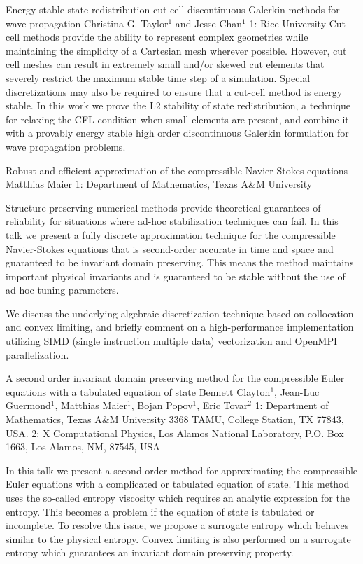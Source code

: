 \begin{addmargin}[2em]{0em}
\vspace{2ex}
\abs
{Energy stable state redistribution cut-cell discontinuous Galerkin methods for wave propagation}
{Christina G. Taylor$^{1}$ and Jesse Chan$^{1}$}
{1: Rice University}
{Cut cell methods provide the ability to represent complex geometries while maintaining the simplicity of a Cartesian mesh wherever possible. However, cut cell meshes can result in extremely small and/or skewed cut elements that severely restrict the maximum stable time step of a simulation. Special discretizations may also be required to ensure that a cut-cell method is energy stable. In this work we prove the L2 stability of state redistribution, a technique for relaxing the CFL condition when small elements are present, and combine it with a provably energy stable high order discontinuous Galerkin formulation for wave propagation problems.}


\vspace{1.5ex}
\abs
{Robust and efficient approximation of the compressible Navier-Stokes equations}
{Matthias Maier}
{1: Department of Mathematics, Texas A\&M University}
{
	Structure preserving numerical methods provide theoretical guarantees of
	reliability for situations where ad-hoc stabilization techniques can fail.
	In this talk we present a fully discrete approximation technique for the
	compressible Navier-Stokes equations that is second-order accurate in
	time and space and guaranteed to be invariant domain preserving. This
	means the method maintains important physical invariants and is
	guaranteed to be stable without the use of ad-hoc tuning parameters.

	We discuss the underlying algebraic discretization technique based on
	collocation and convex limiting, and briefly comment on a high-performance
	implementation utilizing SIMD (single instruction multiple data)
	vectorization and OpenMPI parallelization.
}


\vspace{1.5ex}
\abs
{A second order invariant domain preserving method for the compressible Euler equations with a tabulated equation of state}
{Bennett Clayton$^{1}$, Jean-Luc Guermond$^{1}$, Matthias Maier$^{1}$, Bojan Popov$^{1}$, Eric Tovar$^{2}$}
{1: Department of Mathematics, Texas A\&M University 3368 TAMU, College Station, TX 77843, USA. 2: X Computational Physics, Los Alamos National Laboratory, P.O. Box 1663, Los Alamos, NM, 87545, USA}
{In this talk we present a second order method for approximating the compressible Euler equations with a complicated or tabulated equation of state. This method uses the so-called entropy viscosity which requires an analytic expression for the entropy. This becomes a problem if the equation of state is tabulated or incomplete. To resolve this issue, we propose a surrogate entropy which behaves similar to the physical entropy. Convex limiting is also performed on a surrogate entropy which guarantees an invariant domain preserving property.

}
\end{addmargin}
